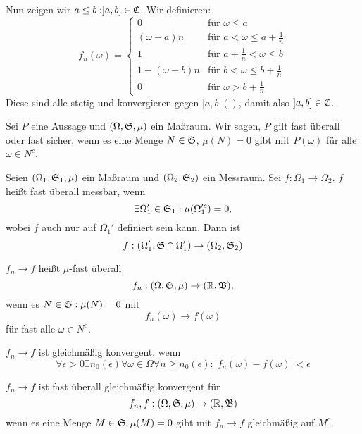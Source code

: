 \begin{bew}
\begin{itemize}
\begin{itemize}
					\end{itemize}
					Nun zeigen wir $a\le b: ]a,b]\in\mathfrak{C}$. Wir definieren:
					\[ f_n(\omega)=\left\{\begin{array}{ll}
					0&\text{für } \omega \le a\\
					(\omega-a)n&\text{für }a<\omega\le a+\frac{1}{n}\\
					1&\text{für }a+\frac{1}{n}<\omega\le b\\
					1-(\omega-b)n&\text{für }b<\omega\le b+\frac{1}{n}\\
					0&\text{für } \omega >b+\frac{1}{n}
					\end{array}\right. \]
					Diese sind alle stetig und konvergieren gegen $]a,b]()$, damit also $]a,b]\in\mathfrak{C}$. 
				\end{itemize}
			\end{bew}
			
			\begin{defi}
				Sei $P$ eine Aussage und $(\Omega,\mathfrak{S}, \mu)$ ein Maßraum. Wir sagen, $P$ gilt fast überall oder fast sicher, wenn es eine Menge $N\in\mathfrak{S}$, $\mu(N)=0$ gibt mit $P(\omega)$ für alle $\omega \in N^c$.
			\end{defi}
			
			\begin{defi}
				Seien $(\Omega_1,\mathfrak{S}_1,\mu)$ ein Maßraum und $(\Omega_2,\mathfrak{S}_2)$ ein Messraum. Sei $f:\Omega_1\to\Omega_2$. $f$ heißt fast überall messbar, wenn
				\[ \exists \Omega_1'\in\mathfrak{S}_1: \mu(\Omega_1'^c)=0, \]
				wobei $f$ auch nur auf $\Omega_1'$ definiert sein kann. Dann ist
				\[ f:(\Omega_1',\mathfrak{S}\cap\Omega_1')\to(\Omega_2,\mathfrak{S}_2) \]
			\end{defi}
			
			\begin{defi}
				$f_n\to f$ heißt $\mu$-fast überall
				\[ f_n: (\Omega,\mathfrak{S},\mu)\to(\mathbb{R},\mathfrak{B}), \]
				wenn es $N\in\mathfrak{S}:\mu(N)=0$ mit 
				\[ f_n(\omega)\to f(\omega) \]
				für fast alle $\omega\in N^c$. 
			\end{defi}
			
			\begin{defi}
				$f_n\to f$ ist gleichmäßig konvergent, wenn
				\[ \forall \epsilon>0\exists n_0(\epsilon)\forall \omega\in\Omega\forall n\ge n_0(\epsilon): |f_n(\omega)-f(\omega)|<\epsilon \]
			\end{defi}
			
			\begin{defi}
				$f_n\to f$ ist fast überall gleichmäßig konvergent für
				\[ f_n,f:(\Omega,\mathfrak{S},\mu)\to (\mathbb{R},\mathfrak{B}) \]
				wenn es eine Menge $M\in\mathfrak{S},\mu(M)=0$ gibt mit $f_n\to f$ gleichmäßig auf $M^c$. 
			\end{defi}
			
